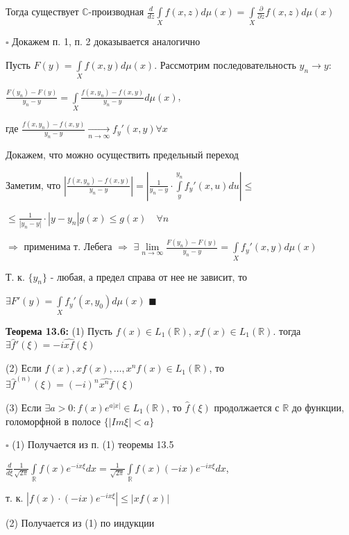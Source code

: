 \documentclass[a4paper]{report}
\begin{document}
Тогда существует  $\mathbb C$-производная $\displaystyle\frac{d}{dz}\displaystyle\int\limits_Xf(x,z)d\mu(x)=\displaystyle\int\limits_X\frac{\partial}{\partial z}f(x,z)d\mu(x)$

\noindent $\square$ Докажем п. 1, п. 2 доказывается аналогично

Пусть $F(y)=\displaystyle\int\limits_Xf(x,y)d\mu(x)$. Рассмотрим последовательность $y_n\to y:$

$\displaystyle\frac{F(y_n)-F(y)}{y_n-y}=\displaystyle\int\limits_X\frac{f(x,y_n)-f(x,y)}{y_n-y}d\mu(x)$,

где $\displaystyle\frac{f(x,y_n)-f(x,y)}{y_n-y}\xrightarrow[n\to\infty]{}f_y'(x,y)\forall x$

Докажем, что можно осуществить предельный переход

Заметим, что $\left|\displaystyle\frac{f(x,y_n)-f(x,y)}{y_n-y}\right|=\left|\displaystyle\frac{1}{y_n-y}\cdot\displaystyle\int\limits_y^{y_n}f_y'(x,u)du\right|\le$

\noindent $\le\displaystyle\frac{1}{|y_n-y|}\cdot|y-y_n|g(x)\le g(x)\quad\forall n$

$\Rightarrow$ применима т. Лебега $\Rightarrow$ $\exists\lim\limits_{n\to\infty}\displaystyle\frac{F(y_n)-F(y)}{y_n-y}=\displaystyle\int\limits_Xf_y'(x,y)d\mu(x)$

Т. к. $\{y_n\}$ - любая, а предел справа от нее не зависит, то

$\exists F'(y)=\displaystyle\int\limits_Xf_y'(x,y_0)d\mu(x)$ $\blacksquare$
\bigskip

\noindent\textbf{Теорема 13.6:} (1) Пусть $f(x)\in L_1(\mathbb R)$, $xf(x)\in L_1(\mathbb R)$. тогда $\exists\hat f'(\xi)=-i\widehat{xf}(\xi)$

(2) Если $f(x),xf(x),\ldots,x^n f(x)\in L_1(\mathbb R)$, то $\exists\hat f^{(n)}(\xi)=(-i)^n\widehat{x^n f}(\xi)$

(3) Если $\exists a>0\colon f(x)e^{a|x|}\in L_1(\mathbb R)$, то $\hat f(\xi)$ продолжается с $\mathbb R$ до функции, голоморфной в полосе $\{|Im\xi|<a\}$

\noindent $\square$ (1) Получается из п. (1) теоремы 13.5

$\displaystyle\frac{d}{d\xi}\frac{1}{\sqrt{2\pi}}\displaystyle\int\limits_{\mathbb R}f(x)e^{-ix\xi}dx=\frac{1}{\sqrt{2\pi}}\displaystyle\int\limits_{\mathbb R}f(x)(-ix)e^{-ix\xi}dx$,

т. к. $|f(x)\cdot(-ix)e^{-ix\xi}|\le|xf(x)|$

(2) Получается из (1) по индукции
\end{document}
